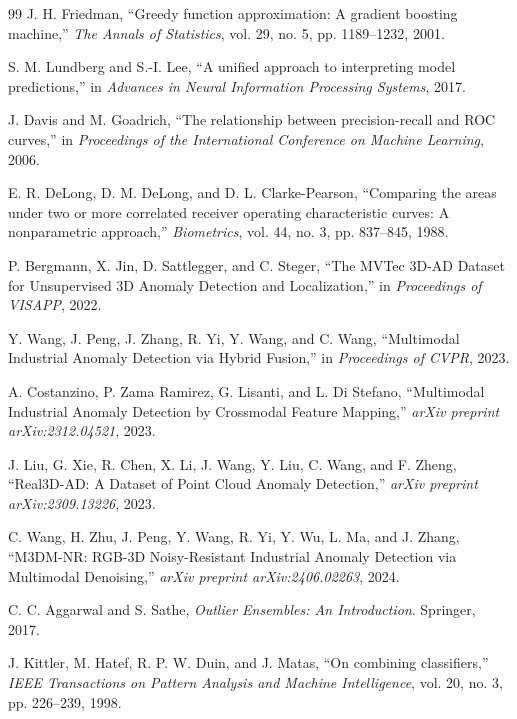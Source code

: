 \documentclass[10pt,conference]{IEEEtran}
\begin{document}
\begin{thebibliography}{99}
J. H. Friedman, ``Greedy function approximation: A gradient boosting machine,''
\emph{The Annals of Statistics}, vol. 29, no. 5, pp. 1189--1232, 2001.

S. M. Lundberg and S.-I. Lee, ``A unified approach to interpreting model
predictions,'' in \emph{Advances in Neural Information Processing Systems}, 2017.

J. Davis and M. Goadrich, ``The relationship between precision-recall and ROC
curves,'' in \emph{Proceedings of the International Conference on Machine
Learning}, 2006.

E. R. DeLong, D. M. DeLong, and D. L. Clarke-Pearson, ``Comparing the areas
under two or more correlated receiver operating characteristic curves: A
nonparametric approach,'' \emph{Biometrics}, vol. 44, no. 3, pp. 837--845,
1988.

P. Bergmann, X. Jin, D. Sattlegger, and C. Steger, ``The MVTec 3D-AD Dataset
for Unsupervised 3D Anomaly Detection and Localization,'' in
\emph{Proceedings of VISAPP}, 2022.

Y. Wang, J. Peng, J. Zhang, R. Yi, Y. Wang, and C. Wang, ``Multimodal
Industrial Anomaly Detection via Hybrid Fusion,'' in \emph{Proceedings of
CVPR}, 2023.

A. Costanzino, P. Zama Ramirez, G. Lisanti, and L. Di Stefano, ``Multimodal
Industrial Anomaly Detection by Crossmodal Feature Mapping,'' \emph{arXiv
preprint arXiv:2312.04521}, 2023.

J. Liu, G. Xie, R. Chen, X. Li, J. Wang, Y. Liu, C. Wang, and F. Zheng,
``Real3D-AD: A Dataset of Point Cloud Anomaly Detection,'' \emph{arXiv
preprint arXiv:2309.13226}, 2023.

C. Wang, H. Zhu, J. Peng, Y. Wang, R. Yi, Y. Wu, L. Ma, and J. Zhang,
``M3DM-NR: RGB-3D Noisy-Resistant Industrial Anomaly Detection via Multimodal
Denoising,'' \emph{arXiv preprint arXiv:2406.02263}, 2024.

C. C. Aggarwal and S. Sathe, \emph{Outlier Ensembles: An Introduction}.
Springer, 2017.

J. Kittler, M. Hatef, R. P. W. Duin, and J. Matas, ``On combining
classifiers,'' \emph{IEEE Transactions on Pattern Analysis and Machine
Intelligence}, vol. 20, no. 3, pp. 226--239, 1998.


\end{thebibliography}
\end{document}
